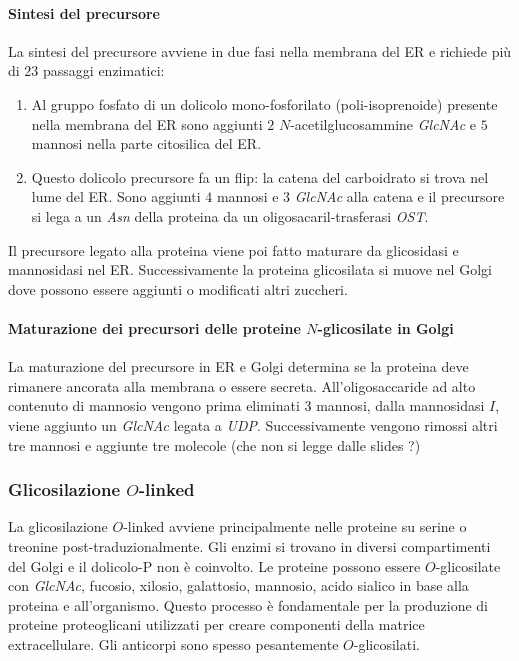			\paragraph{Sintesi del precursore}
			La sintesi del precursore avviene in due fasi nella membrana del ER e richiede pi\`u di $23$ passaggi enzimatici:
			\begin{enumerate}
				\item Al gruppo fosfato di un dolicolo mono-fosforilato (poli-isoprenoide) presente nella membrana del ER sono aggiunti $2$ $N$-acetilglucosammine \emph{GlcNAc} e $5$ mannosi nella parte citosilica del ER.
				\item Questo dolicolo precursore fa un flip: la catena del carboidrato si trova nel lume del ER. 
					Sono aggiunti $4$ mannosi e $3$ \emph{GlcNAc} alla catena e il precursore si lega a un \emph{Asn} della proteina da un oligosacaril-trasferasi \emph{OST}.
			\end{enumerate}
			Il precursore legato alla proteina viene poi fatto maturare da glicosidasi e mannosidasi nel ER.
			Successivamente la proteina glicosilata si muove nel Golgi dove possono essere aggiunti o modificati altri zuccheri. 

			\paragraph{Maturazione dei precursori delle proteine $N$-glicosilate in Golgi}
			La maturazione del precursore in ER e Golgi determina se la proteina deve rimanere ancorata alla membrana o essere secreta.
			All'oligosaccaride ad alto contenuto di mannosio vengono prima eliminati $3$ mannosi, dalla mannosidasi $I$, viene aggiunto un \emph{GlcNAc} legata a \emph{UDP}.
			Successivamente vengono rimossi altri tre mannosi e aggiunte tre molecole (che non si legge dalle slides ?)

		\subsubsection{Glicosilazione $O$-linked}
		La glicosilazione $O$-linked avviene principalmente nelle proteine su serine o treonine post-traduzionalmente. 
		Gli enzimi si trovano in diversi compartimenti del Golgi e il dolicolo-P non \`e coinvolto.
		Le proteine possono essere $O$-glicosilate con \emph{GlcNAc}, fucosio, xilosio, galattosio, mannosio, acido sialico in base alla proteina e all'organismo.
		Questo processo \`e fondamentale per la produzione di proteine proteoglicani utilizzati per creare componenti della matrice extracellulare.
		Gli anticorpi sono spesso pesantemente $O$-glicosilati.

